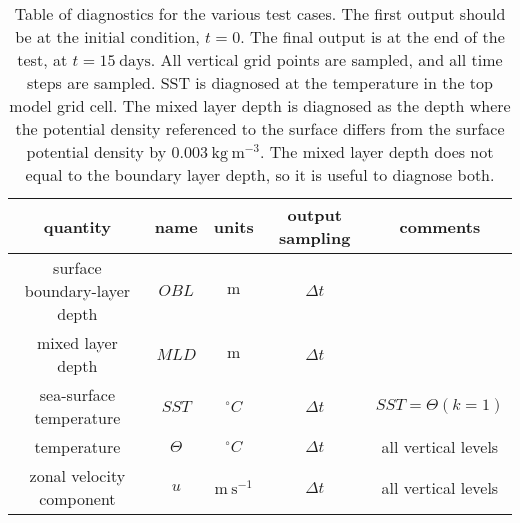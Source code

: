 \begin{table}[htdp]
\begin{center}
\begin{tabular}{|c|c|c|c|c|}
\hline
{\sc quantity}                                 & {\sc name}        & {\sc units}                              & {\sc output sampling}     & {\sc comments} \\
\hline
surface boundary-layer depth          & $OBL$              & $\mbox{m}$                            & $\Delta t$                       &  \\
\hline 
mixed layer depth                           & $MLD$              & $\mbox{m}$                            & $\Delta t$                       &  \\
\hline 
sea-surface temperature                 & $SST$               & $^{\circ}C$                                & $\Delta t$                       & $SST=\Theta(k=1)$\\
\hline 
temperature                                    & $\Theta$         & $^{\circ}C$                                  &  $\Delta t$  &  all vertical levels \\
\hline
 zonal velocity component               & $u$                   & $\mbox{m}~\mbox{s}^{-1}$       &  $\Delta t$  &  all vertical levels \\
\hline 
\end{tabular}
\end{center}
\caption{Table of diagnostics for the various test cases. 
  The first output should be at the initial condition, $t=0$. The final 
  output is at the end of the test, at $t=15~\mbox{days}$.  
  All vertical grid points are sampled, and all time steps are
  sampled. SST is diagnosed at the temperature in the top model grid
  cell.  The mixed layer depth is diagnosed as the depth where the
  potential density referenced to the surface differs from the surface
  potential density by $0.003~\mbox{kg}~\mbox{m}^{-3}$.  The mixed layer
  depth does not equal to the boundary layer depth, so it is useful to
  diagnose both.}
\label{table:metrics}
\end{table}



